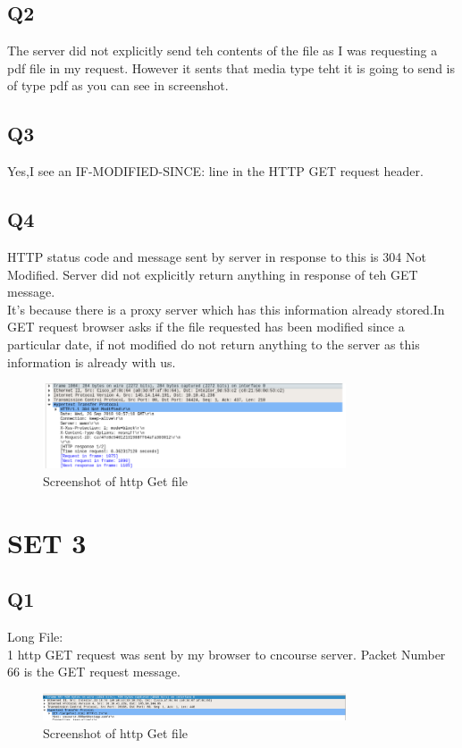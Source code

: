 \documentclass{article}
\begin{document}
\subsection{Q2}
The server did not explicitly send teh contents of the file as I was requesting a pdf file in my request. However it sents that media type teht it is going to send is of type pdf as you can see in screenshot.\\
\subsection{Q3}
Yes,I see an IF-MODIFIED-SINCE: line in the HTTP GET request header.\\
\subsection{Q4}
HTTP status code and message sent by server in response to this is 304 Not Modified. Server did not explicitly return anything in response of teh GET message.\\
It’s because there is a proxy server which has this information already stored.In GET request browser asks if the file requested has been modified since a particular date, if not modified do not return anything to the server as this information is already with us.\\
  \begin{figure}[H]
 \centering
 \includegraphics[width=0.8\textwidth]{../Set2/q4/a.png}
 \caption{\label{fig:PING}Screenshot of http Get file}
 \end{figure}
\section{SET 3}

\subsection{Q1}
Long File: \\
1 http GET request was sent by my browser to cncourse server. Packet Number 66 is the GET request message. \\
  \begin{figure}[H]
 \centering
 \includegraphics[width=0.8\textwidth]{../Set3/q1/a.png}
 \caption{\label{fig:PING}Screenshot of http Get file}
 \end{figure}
 
\end{document}
